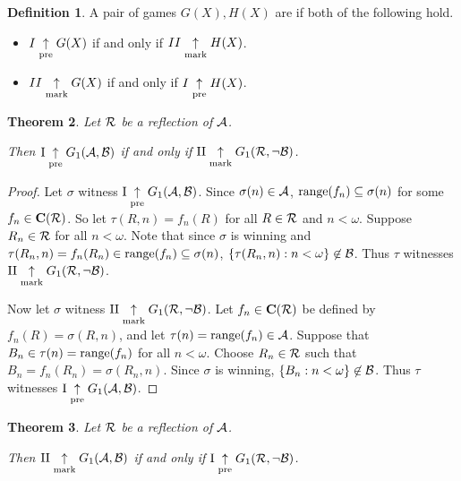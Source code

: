 \documentclass{amsart}
\theoremstyle{plain}
\newtheorem{theorem}{Theorem}
\theoremstyle{definition}
\newtheorem{definition}[theorem]{Definition}
\theoremstyle{remark}
\theoremstyle{plain}
\theoremstyle{definition}
\theoremstyle{remark}
\begin{document}
\begin{definition}
  A pair of games \(G(X),H(X)\) are  if both
  of the following hold.
  \begin{itemize}
    \item \(I\underset{\text{pre}}{\uparrow} G(X)\) if and only if \(II\underset{\text{mark}}{\uparrow} H(X)\).
    \item \(II\underset{\text{mark}}{\uparrow} G(X)\) if and only if \(I\underset{\text{pre}}{\uparrow} H(X)\).
  \end{itemize}
\end{definition}

\begin{theorem}
  Let \(\mathcal{R}\) be a reflection of \(\mathcal{A}\). 

  Then
  \(\mathrm{I}\underset{\text{pre}}{\uparrow}G_{1}(\mathcal{A},\mathcal{B})\) if and only if
  \(\mathrm{II}\underset{\text{mark}}{\uparrow}G_{1}(\mathcal{R},\neg\mathcal{B})\).
\end{theorem}

\begin{proof}
  Let \(\sigma\) witness 
  \(\mathrm{I}\underset{\text{pre}}{\uparrow}G_{1}(\mathcal{A},\mathcal{B})\).
  Since \(\sigma(n)\in\mathcal{A}\),
  \(\text{range}(f_n)\subseteq\sigma(n)\)
  for some \(f_n\in\mathbf C(\mathcal{R})\). So let
  \(\tau(R,n)=f_n(R)\) for all \(R\in \mathcal{R}\) and \(n<\omega\).
  Suppose \(R_n\in \mathcal{R}\) for all \(n<\omega\).
  Note that since \(\sigma\) is winning and 
  \(\tau(R_n,n)=f_n(R_n)\in\text{range}(f_n)\subseteq\sigma(n)\),
  \(\{\tau(R_n,n):n<\omega\}\not\in\mathcal{B}\). Thus \(\tau\) witnesses
  \(\mathrm{II}\underset{\text{mark}}{\uparrow}G_{1}(\mathcal{R},\neg\mathcal{B})\).

  Now let \(\sigma\) witness
  \(\mathrm{II}\underset{\text{mark}}{\uparrow}G_{1}(\mathcal{R},\neg\mathcal{B})\).
  Let \(f_n\in\mathbf C(\mathcal{R})\) be defined by \(f_n(R)=\sigma(R,n)\),
  and let \(\tau(n)=\text{range}(f_n)\in\mathcal{A}\). 
  Suppose that \(B_n\in\tau(n)=\text{range}(f_n)\) for
  all \(n<\omega\). Choose \(R_n\in\mathcal{R}\) such that 
  \(B_n=f_n(R_n)=\sigma(R_n,n)\). Since \(\sigma\) is winning,
  \(\{B_n:n<\omega\}\not\in\mathcal{B}\). Thus \(\tau\) witnesses
  \(\mathrm{I}\underset{\text{pre}}{\uparrow}G_{1}(\mathcal{A},\mathcal{B})\).
\end{proof}

\begin{theorem}
  Let \(\mathcal{R}\) be a reflection of \(\mathcal{A}\). 

  Then
  \(\mathrm{II}\underset{\text{mark}}{\uparrow}G_{1}(\mathcal{A},\mathcal{B})\) if and only if
  \(\mathrm{I}\underset{\text{pre}}{\uparrow}G_{1}(\mathcal{R},\neg\mathcal{B})\).
\end{theorem}
\end{document}
